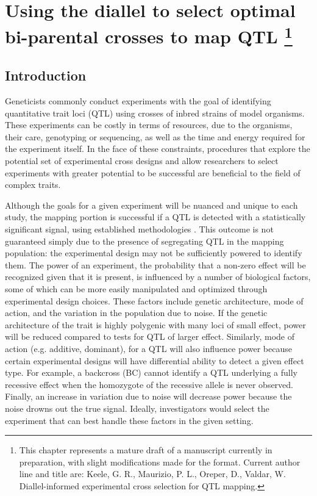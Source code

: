 \chapter[Using the diallel to select optimal bi-parental crosses to map QTL]{Using the diallel to select optimal bi-parental crosses to map QTL
\footnote{This chapter represents a mature draft of a manuscript currently in preparation, with slight modifications made for the format. Current author line and title are: Keele, G. R., Maurizio, P. L., Oreper, D., Valdar, W. Diallel-informed experimental cross selection for QTL mapping.}}
\label{chap:didact}

\section{Introduction}

Geneticists commonly conduct experiments with the goal of identifying quantitative trait loci (QTL) using crosses of inbred strains of model organisms. These experiments can be costly in terms of resources, due to the organisms, their care, genotyping or sequencing, as well as the time and energy required for the experiment itself. In the face of these constraints, procedures that explore the potential set of experimental cross designs and allow researchers to select experiments with greater potential to be successful are beneficial to the field of complex traits.

Although the goals for a given experiment will be nuanced and unique to each study, the mapping portion is successful if a QTL is detected with a statistically significant signal, using established methodologies \citep{Lander1989,Haley1992,Dupuis1999,Broman2001}. This outcome is not guaranteed simply due to the presence of segregating QTL in the mapping population: the experimental design may not be sufficiently powered to identify them. The power of an experiment, the probability that a non-zero effect will be recognized given that it is present, is influenced by a number of biological factors, some of which can be more easily manipulated and optimized through experimental design choices. These factors include genetic architecture, mode of action, and the variation in the population due to noise. If the genetic architecture of the trait is highly polygenic with many loci of small effect, power will be reduced compared to tests for QTL of larger effect. Similarly, mode of action (e.g. additive, dominant), for a QTL will also influence power because certain experimental designs will have differential ability to detect a given effect type. For example, a backcross (BC) cannot identify a QTL underlying a fully recessive effect when the homozygote of the recessive allele is never observed. Finally, an increase in variation due to noise will decrease power because the noise drowns out the true signal. Ideally, investigators would select the experiment that can best handle these factors in the given setting.

